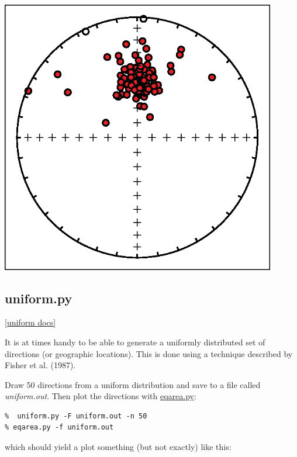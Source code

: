 \documentclass[11pt]{book}
\begin{document}
{{\includegraphics[width=12cm]{EPSfiles/tk03.eps}


\subsection{uniform.py}
\href{http://earthref.org/PmagPy/pmagpydocs/uniform-module.html}{[uniform docs]}

It is at times handy to be able to generate a uniformly distributed set of directions (or geographic locations).  This is done using a technique described by Fisher et al. (1987).  

Draw 50 directions from a uniform distribution and save to a file called {\it uniform.out}.  Then plot the directions with \href{#eqarea.py}{eqarea.py}:

\begin{verbatim}
%  uniform.py -F uniform.out -n 50
% eqarea.py -f uniform.out
\end{verbatim}   

which should yield a plot something (but not exactly) like this:

}}
\end{document}

